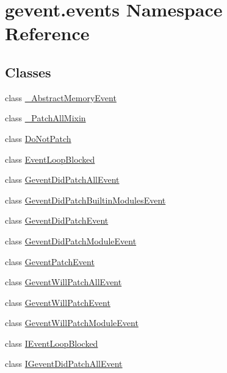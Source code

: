 \hypertarget{namespacegevent_1_1events}{}\section{gevent.\+events Namespace Reference}
\label{namespacegevent_1_1events}
\subsection*{Classes}
\begin{DoxyCompactItemize}
\item 
class \hyperlink{classgevent_1_1events_1_1___abstract_memory_event}{\+\_\+\+Abstract\+Memory\+Event}
\item 
class \hyperlink{classgevent_1_1events_1_1___patch_all_mixin}{\+\_\+\+Patch\+All\+Mixin}
\item 
class \hyperlink{classgevent_1_1events_1_1_do_not_patch}{Do\+Not\+Patch}
\item 
class \hyperlink{classgevent_1_1events_1_1_event_loop_blocked}{Event\+Loop\+Blocked}
\item 
class \hyperlink{classgevent_1_1events_1_1_gevent_did_patch_all_event}{Gevent\+Did\+Patch\+All\+Event}
\item 
class \hyperlink{classgevent_1_1events_1_1_gevent_did_patch_builtin_modules_event}{Gevent\+Did\+Patch\+Builtin\+Modules\+Event}
\item 
class \hyperlink{classgevent_1_1events_1_1_gevent_did_patch_event}{Gevent\+Did\+Patch\+Event}
\item 
class \hyperlink{classgevent_1_1events_1_1_gevent_did_patch_module_event}{Gevent\+Did\+Patch\+Module\+Event}
\item 
class \hyperlink{classgevent_1_1events_1_1_gevent_patch_event}{Gevent\+Patch\+Event}
\item 
class \hyperlink{classgevent_1_1events_1_1_gevent_will_patch_all_event}{Gevent\+Will\+Patch\+All\+Event}
\item 
class \hyperlink{classgevent_1_1events_1_1_gevent_will_patch_event}{Gevent\+Will\+Patch\+Event}
\item 
class \hyperlink{classgevent_1_1events_1_1_gevent_will_patch_module_event}{Gevent\+Will\+Patch\+Module\+Event}
\item 
class \hyperlink{classgevent_1_1events_1_1_i_event_loop_blocked}{I\+Event\+Loop\+Blocked}
\item 
class \hyperlink{classgevent_1_1events_1_1_i_gevent_did_patch_all_event}{I\+Gevent\+Did\+Patch\+All\+Event}

\end{DoxyCompactItemize}
